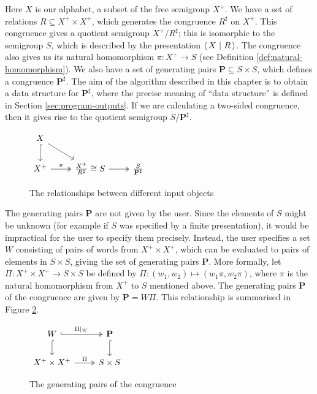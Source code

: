 Here $X$ is our alphabet, a subset of the free semigroup $X^+$.  We have a set
of relations $R \subseteq X^+ \times X^+$, which generates the congruence
$R^\sharp$ on $X^+$.  This congruence gives a quotient semigroup
$X^+ / R^\sharp$; this is isomorphic to the semigroup $S$,
which is described by the presentation $\left\langle\,X ~\middle|~ R\,\right\rangle$.  The
congruence also gives us its natural homomorphism $\pi: X^+ \to S$ (see
Definition \ref{def:natural-homomorphism}).  We also have a set of generating pairs
$\mathbf{P} \subseteq S \times S$, which defines a congruence
$\mathbf{P}^\sharp$.  The aim of the algorithm described in this chapter is to
obtain a data structure for $\mathbf{P}^\sharp$, where the precise meaning of
``data structure'' is defined in Section \ref{sec:program-outputs}.  If we are
calculating a two-sided congruence, then it gives rise to the
quotient semigroup $S / \mathbf{P}^\sharp$.

\begin{figure}[h]
  \centering
  $\begin{tikzcd}
    X \arrow[dr] \arrow[d, hook] & \\
    X^+ \arrow[r, two heads, "\pi"] & \frac{X^+}{R^\sharp} \cong S \arrow[r, two heads] & \frac{S}{\mathbf{P}^\sharp}
  \end{tikzcd}$
  \caption{The relationships between different input objects}
  \label{fig:pairs-cd-1}
\end{figure}

The generating pairs $\mathbf{P}$ are not given by the user.  Since the elements
of $S$ might be unknown (for example if $S$ was specified by a finite
presentation), it would be impractical for the user to specify them precisely.
Instead, the user specifies a set $W$ consisting of pairs of words from
$X^+ \times X^+$, which can be evaluated to pairs of elements in $S \times S$,
giving the set of generating pairs $\mathbf{P}$.
More formally, let
$\Pi: X^+ \times X^+ \to S \times S$ be defined by
$\Pi: (w_1, w_2) \mapsto (w_1\pi, w_2\pi)$, where $\pi$ is the natural
homomorphism from $X^+$ to $S$ mentioned above.  The generating pairs
$\mathbf{P}$ of the congruence are given by $\mathbf{P} = W \Pi$.
This relationship is summarised in Figure \ref{fig:pairs-cd-2}.

\begin{figure}[h]
  \centering
  $\begin{tikzcd}
    W \arrow[r, hook, two heads, "\Pi|_W"] \arrow[d, hook] & \mathbf{P} \arrow[d, hook] \\
    X^+ \times X^+ \arrow[r, two heads, "\Pi"] & S \times S
  \end{tikzcd}$
  \caption{The generating pairs of the congruence}
  \label{fig:pairs-cd-2}
\end{figure}

